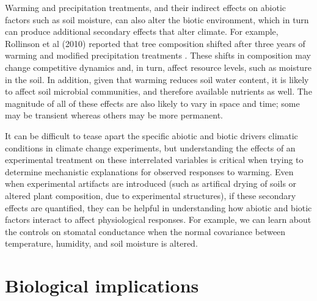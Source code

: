 \documentclass{article}
\begin{document}
\par Warming and precipitation treatments, and their indirect effects on abiotic factors such as soil moisture, can also alter the biotic environment, which in turn can produce additional secondary effects that alter climate. For example, Rollinson et al (2010) reported that tree composition shifted after three years of warming and modified precipitation treatments \citep{rollinson2012}. These shifts in composition may change competitive dynamics and, in turn, affect resource levels, such as moisture in the soil. In addition, given that warming reduces soil water content, it is likely to affect soil microbial communities, and therefore available nutrients as well. The magnitude of all of these effects are also likely to vary in space and time; some may be transient whereas others may be more permanent. 
\par It can be difficult to tease apart the specific abiotic and biotic drivers climatic conditions in climate change experiments, but understanding the effects of an experimental treatment on these interrelated variables is critical when trying to determine mechanistic explanations for observed responses to warming. Even when experimental artifacts are introduced (such as artifical drying of soils or altered plant composition, due to experimental structures), if these secondary effects are quantified, they can be helpful in understanding how abiotic and biotic factors interact to affect physiological responses. For example, we can learn about the controls on stomatal conductance when the normal covariance between temperature, humidity, and soil moisture is altered.

\section* {Biological implications}
\end{document}
